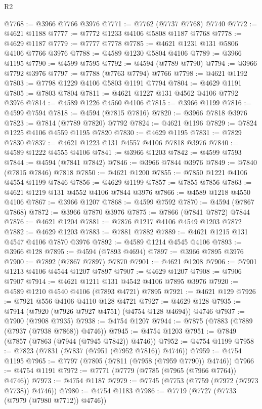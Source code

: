\begin{lexlean}{R2}
\begin{coremodule}
@7768 := @3966 @7766 @3976
@7771 := @7762 (@7737 @7768) @7740
@7772 := @4621 @1188
@7777 := @7772 @1233 @4106 @5808 @1187 @7768
@7778 := @4629 @1187
@7779 := @7777 @7778
@7785 := @4621 @1231 @131 @5806 @4106 @7766 @3976
@7788 := @4589 @1230 @5804 @4106
@7789 := @3966 @1195
@7790 := @4599 @7595
@7792 := @4594 (@7789 @7790)
@7794 := @3966 @7792 @3976
@7797 := @7788 (@7763 @7794) @7766
@7798 := @4621 @1192
@7803 := @7798 @1229 @4106 @5803 @1191 @7794
@7804 := @4629 @1191
@7805 := @7803 @7804
@7811 := @4621 @1227 @131 @4562 @4106 @7792 @3976
@7814 := @4589 @1226 @4560 @4106
@7815 := @3966 @1199
@7816 := @4599 @7594
@7818 := @4594 (@7815 @7816)
@7820 := @3966 @7818 @3976
@7823 := @7814 (@7789 @7820) @7792
@7824 := @4621 @1196
@7829 := @7824 @1225 @4106 @4559 @1195 @7820
@7830 := @4629 @1195
@7831 := @7829 @7830
@7837 := @4621 @1223 @131 @4557 @4106 @7818 @3976
@7840 := @4589 @1222 @4555 @4106
@7841 := @3966 @1203
@7842 := @4599 @7593
@7844 := @4594 (@7841 @7842)
@7846 := @3966 @7844 @3976
@7849 := @7840 (@7815 @7846) @7818
@7850 := @4621 @1200
@7855 := @7850 @1221 @4106 @4554 @1199 @7846
@7856 := @4629 @1199
@7857 := @7855 @7856
@7863 := @4621 @1219 @131 @4552 @4106 @7844 @3976
@7866 := @4589 @1218 @4550 @4106
@7867 := @3966 @1207
@7868 := @4599 @7592
@7870 := @4594 (@7867 @7868)
@7872 := @3966 @7870 @3976
@7875 := @7866 (@7841 @7872) @7844
@7876 := @4621 @1204
@7881 := @7876 @1217 @4106 @4549 @1203 @7872
@7882 := @4629 @1203
@7883 := @7881 @7882
@7889 := @4621 @1215 @131 @4547 @4106 @7870 @3976
@7892 := @4589 @1214 @4545 @4106
@7893 := @3966 @128
@7895 := @4594 (@7893 @4694)
@7897 := @3966 @7895 @3976
@7900 := @7892 (@7867 @7897) @7870
@7901 := @4621 @1208
@7906 := @7901 @1213 @4106 @4544 @1207 @7897
@7907 := @4629 @1207
@7908 := @7906 @7907
@7914 := @4621 @1211 @131 @4542 @4106 @7895 @3976
@7920 := @4589 @1210 @4540 @4106 (@7893 @4721) @7895
@7921 := @4621 @129
@7926 := @7921 @556 @4106 @4110 @128 @4721
@7927 := @4629 @128
@7935 := @7914 (@7920 (@7926 @7927 @4751) (@4754 @128 @4694)) @4746
@7937 := @7900 (@7908 @7935)
@7938 := @4754 @1207
@7944 := @7875 (@7883 (@7889 (@7937 (@7938 @7868)) @4746))
@7945 := @4754 @1203
@7951 := @7849 (@7857 (@7863 (@7944 (@7945 @7842)) @4746))
@7952 := @4754 @1199
@7958 := @7823 (@7831 (@7837 (@7951 (@7952 @7816)) @4746))
@7959 := @4754 @1195
@7965 := @7797 (@7805 (@7811 (@7958 (@7959 @7790)) @4746))
@7966 := @4754 @1191
@7972 := @7771 (@7779 (@7785 (@7965 (@7966 @7764)) @4746))
@7973 := @4754 @1187
@7979 := @7745 (@7753 (@7759 (@7972 (@7973 @7738)) @4746))
@7980 := @4754 @1183
@7986 := @7719 (@7727 (@7733 (@7979 (@7980 @7712)) @4746))

\end{coremodule}
\end{lexlean}
